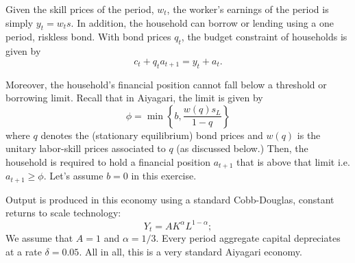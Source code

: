\documentclass{article}
\begin{document}
Given the skill prices of the period, $w_{t}$, the worker's earnings of the period is simply $y_{t}=w_{t}s$.
In addition, the household can borrow or lending using a one period, riskless bond.
With bond prices $q_{t}$, the budget constraint of households is given by
\begin{equation*}
c_{t}+q_{t}a_{t+1}=y_{t}+a_{t}.
\end{equation*}

Moreover, the household's financial position cannot fall below a threshold or borrowing limit.
Recall that in Aiyagari, the limit is given by
\begin{equation*}
\phi=\min\left\{b,\frac{w(q)s_{L}}{1-q}\right\}
\end{equation*}
where $q$ denotes the (stationary equilibrium) bond prices and $w(q)$ is the unitary labor-skill prices associated to $q$ (as discussed below.) Then, the household is required to hold a financial position $a_{t+1}$ that is above that limit i.e.
$a_{t+1} \geq \phi$.
Let's assume $b=0$ in this exercise.

Output is produced in this economy using a standard Cobb-Douglas, constant returns to scale technology:
\begin{equation*}
Y_{t}=AK^{\alpha}L^{1-\alpha};
\end{equation*}
We assume that $A=1$ and $\alpha=1/3$. Every period aggregate capital depreciates at a rate $\delta=0.05$.
All in all, this is a very standard Aiyagari economy.
\end{document}
